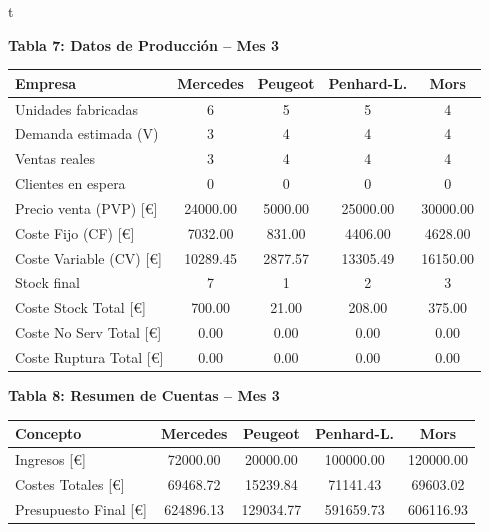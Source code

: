 \documentclass{standalone}
\begin{document}
%		
%	
t
%	
%	
	\begin{minipage}{1.08\linewidth}
		\centering
		
		\textbf{Tabla 7: Datos de Producción – Mes 3}\\[0.5em]
		\begin{tabular}{@{}l
				S[table-format=2.0]
				S[table-format=2.0]
				S[table-format=2.0]
				S[table-format=2.0]@{}}
			\toprule
			\textbf{Empresa} & \textbf{Mercedes} & \textbf{Peugeot} & \textbf{Penhard-L.} & \textbf{Mors} \\
			\midrule
			Unidades fabricadas & 6 & 5 & 5 & 4 \\
			Demanda estimada (V) & 3 & 4 & 4 & 4 \\
			Ventas reales & 3 & 4 & 4 & 4 \\
			Clientes en espera & 0 & 0 & 0 & 0 \\
			Precio venta (PVP) [\euro] & 24000.00 & 5000.00 & 25000.00 & 30000.00 \\
			Coste Fijo (CF) [\euro] & 7032.00 & 831.00 & 4406.00 & 4628.00 \\
			Coste Variable (CV) [\euro] & 10289.45 & 2877.57 & 13305.49 & 16150.00 \\
			Stock final & 7 & 1 & 2 & 3 \\
			Coste Stock Total [\euro] & 700.00 & 21.00 & 208.00 & 375.00 \\
			Coste No Serv Total [\euro] & 0.00 & 0.00 & 0.00 & 0.00 \\
			Coste Ruptura Total [\euro] & 0.00 & 0.00 & 0.00 & 0.00 \\
			\bottomrule
		\end{tabular}
		
		\vspace{2em} %
		
		\textbf{Tabla 8: Resumen de Cuentas – Mes 3}\\[0.5em]
		\begin{tabular}{@{}l
				S[table-format=7.2]
				S[table-format=7.2]
				S[table-format=7.2]
				S[table-format=7.2]@{}}
			\toprule
			\textbf{Concepto} & \textbf{Mercedes} & \textbf{Peugeot} & \textbf{Penhard-L.} & \textbf{Mors} \\
			\midrule
			Ingresos [\euro] & 72000.00 & 20000.00 & 100000.00 & 120000.00 \\
			Costes Totales [\euro] & 69468.72 & 15239.84 & 71141.43 & 69603.02 \\
			Presupuesto Final [\euro] & 624896.13 & 129034.77 & 591659.73 & 606116.93 \\
			\bottomrule
		\end{tabular}
		
	\end{minipage}
\end{document}
